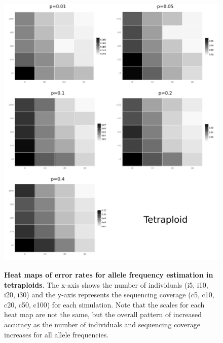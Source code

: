 \documentclass[11pt,english,letterpaper,oneside]{article}
\begin{document}
\begin{figure}
\centering
\caption{\textbf{Heat maps of error rates for allele frequency estimation in tetraploids}. The x-axis shows the number of individuals (i5, i10, i20, i30) and the y-axis represents the sequencing coverage (c5, c10, c20, c50, c100) for each simulation. Note that the scales for each heat map are not the same, but the overall pattern of increased accuracy as the number of individuals and sequencing coverage increases for all allele frequencies.}
\vspace{0.25in}
\includegraphics{fig/figure2-tetra-heatmaps}
\label{fig:tetra-heatmaps}
\end{figure}
\end{document}
